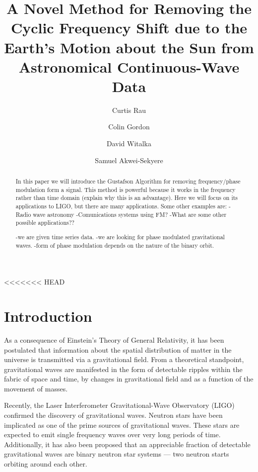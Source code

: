 \documentclass[twocolumn, groupedaddress]{revtex4-1}
\begin{document}
\author{Curtis Rau}
\author{Colin Gordon}
\author{David Witalka}
\author{Samuel Akwei-Sekyere}
\title{A Novel Method for Removing the Cyclic Frequency Shift due to the Earth's Motion about the Sun from Astronomical Continuous-Wave Data}

\begin{abstract}
In this paper we will introduce the Gustafson Algorithm for removing frequency/phase modulation form a signal.  This method is powerful because it works in the frequency rather than time domain (explain why this is an advantage).  Here we will focus on its applications to LIGO, but there are many applications.  Some other examples are:
-Radio wave astronomy
-Comunications systems using FM?
-What are some other possible applications??

-we are given time series data.
-we are looking for phase modulated gravitational waves.
-form of phase modulation depends on the nature of the binary orbit.
\citep{Saulson}
\citep{LSCall}
\citep{Deanna}
\citep{folland}
\citep{griffiths}
\end{abstract}

\maketitle



<<<<<<< HEAD
\section{Introduction}
As a consequence of Einstein's Theory of General Relativity, it has been postulated that information about the spatial distribution of matter in the universe is transmitted via a gravitational field. From a theoretical standpoint, gravitational waves are manifested in the form of detectable ripples within the fabric of space and time, by changes in gravitational field and as a function of the movement of masses.

Recently, the Laser Interferometer Gravitational-Wave Observatory (LIGO) confirmed the discovery of gravitational waves. Neutron stars have been implicated as one of the prime sources of gravitational waves. These stars are expected to emit single frequency waves over very long periods of time. Additionally, it has also been proposed that an appreciable fraction of detectable gravitational waves are binary neutron star systems --- two neutron starts orbiting around each other.
\end{document}
